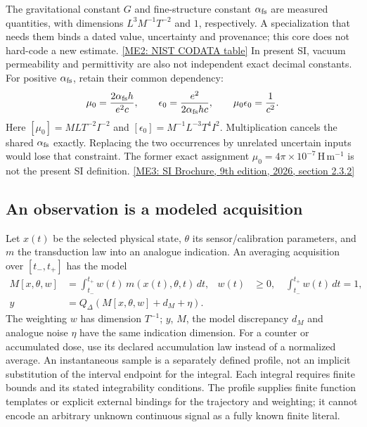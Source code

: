 The gravitational constant $G$ and fine-structure constant $\alpha_{\rm fs}$
are measured quantities, with dimensions $L^3M^{-1}T^{-2}$ and $1$,
respectively. A specialization that needs them binds a dated value, uncertainty
and provenance; this core does not hard-code a new estimate.
\href{https://physics.nist.gov/cuu/Constants/Table/allascii.txt}{[ME2: NIST CODATA table]}
In present SI, vacuum permeability and permittivity are also not independent
exact decimal constants. For positive $\alpha_{\rm fs}$, retain their common
dependency:
\begin{equation}
 \mu_0=\frac{2\alpha_{\rm fs}h}{e^2c},\qquad
 \epsilon_0=\frac{e^2}{2\alpha_{\rm fs}hc},\qquad
 \mu_0\epsilon_0=\frac1{c^2}.
 \label{r13-measurement-vacuum}
\end{equation}
Here $[\mu_0]=MLT^{-2}I^{-2}$ and
$[\epsilon_0]=M^{-1}L^{-3}T^4I^2$. Multiplication cancels the shared
$\alpha_{\rm fs}$ exactly. Replacing the two occurrences by unrelated uncertain
inputs would lose that constraint. The former exact assignment
$\mu_0=4\pi\times10^{-7}\,\mathrm{H\,m^{-1}}$ is not the present SI definition.
\href{https://doi.org/10.59161/AUEZ1291}{[ME3: SI Brochure, 9th edition, 2026, section 2.3.2]}

\subsection{An observation is a modeled acquisition}
\label{r13-measurement-equation}

Let $x(t)$ be the selected physical state, $\theta$ its sensor/calibration
parameters, and $m$ the transduction law into an analogue indication. An
averaging acquisition over $[t_-,t_+]$ has the model
\begin{align}
 M[x,\theta,w]&=\int_{t_-}^{t_+}w(t)\,m(x(t),\theta,t)\,dt,
 &w(t)&\geq0,\quad\int_{t_-}^{t_+}w(t)\,dt=1,\label{r13-measurement-acquisition}\\
 y&=Q_{\Delta}\!\left(M[x,\theta,w]+d_M+\eta\right).
 \label{r13-measurement-observation}
\end{align}
The weighting $w$ has dimension $T^{-1}$; $y$, $M$, the model discrepancy
$d_M$ and analogue noise $\eta$ have the same indication dimension. For a
counter or accumulated dose, use its declared accumulation law instead of a
normalized average. An instantaneous sample is a separately defined profile,
not an implicit substitution of the interval endpoint for the integral.
Each integral requires finite bounds and its stated integrability conditions.
The profile supplies finite function templates or explicit external bindings
for the trajectory and weighting; it cannot encode an arbitrary unknown
continuous signal as a fully known finite literal.

